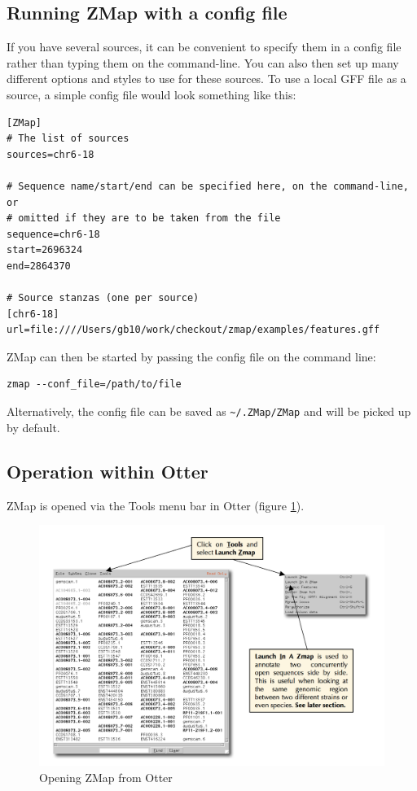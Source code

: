 \documentclass[letterpaper]{article}
\begin{document}
\subsection{Running ZMap with a config file}
If you have several sources, it can be convenient to specify them in a config file rather than typing them on the command-line. You can also then set up many different options and styles to use for these sources. To use a local GFF file as a source, a simple config file would look something like this:
\begin{lstlisting}
[ZMap]
# The list of sources
sources=chr6-18

# Sequence name/start/end can be specified here, on the command-line, or
# omitted if they are to be taken from the file
sequence=chr6-18
start=2696324
end=2864370

# Source stanzas (one per source)
[chr6-18]
url=file:////Users/gb10/work/checkout/zmap/examples/features.gff
\end{lstlisting}

ZMap can then be started by passing the config file on the command line:
\begin{lstlisting}
zmap --conf_file=/path/to/file
\end{lstlisting}

Alternatively, the config file can be saved as \lstinline{~/.ZMap/ZMap} and will be picked up by default.

\subsection{Operation within Otter}
ZMap is opened via the Tools menu bar in Otter (figure \ref{img_open_from_otterlace}).

\begin{figure}
\centering
\color[rgb]{0.30980393,0.5058824,0.7411765}
\includegraphics[width=15.231cm]{img_open_from_otterlace.png}
\caption{Opening ZMap from Otter}
\label{img_open_from_otterlace}
\end{figure}
\end{document}

